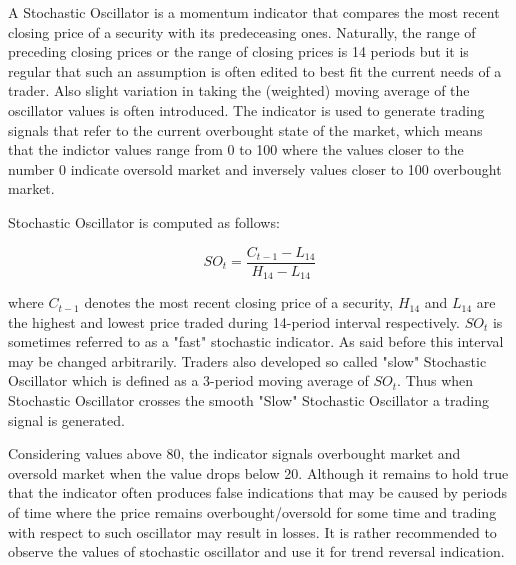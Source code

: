 	A Stochastic Oscillator is a momentum indicator that compares the most recent closing price of a security with its predeceasing ones. Naturally, the range of preceding closing prices or the range of closing prices is 14 periods but it is regular that such an assumption is often edited to best fit the current needs of a trader. Also slight variation in taking the (weighted) moving average of the oscillator values is often introduced. The indicator is used to generate trading signals that refer to the current overbought state of the market, which means that the indictor values range from 0 to 100 where the values closer to the number 0 indicate oversold market and inversely values closer to 100 overbought market. 
	
Stochastic Oscillator is computed as follows:

\begin{equation}
SO_{t} = \frac{C_{t-1} - L_{14}}{H_{14} - L_{14}}
\end{equation}

where $C_{t-1}$ denotes the most recent closing price of a security, $H_{14}$ and $L_{14}$ are the highest and lowest price traded during 14-period interval respectively. $SO_{t}$ is sometimes referred to as a "fast" stochastic indicator. As said before this interval may be changed arbitrarily. Traders also developed so called "slow" Stochastic Oscillator which is defined as a 3-period moving average of $SO_{t}$. Thus when Stochastic Oscillator crosses the smooth "Slow" Stochastic Oscillator a trading signal is generated.

Considering values above 80, the indicator signals overbought market and oversold market when the value drops below 20. Although it remains to hold true that the indicator often produces false indications that may be caused by periods of time where the price remains overbought/oversold for some time and trading with respect to such oscillator may result in losses. It is rather recommended to observe the values of stochastic oscillator and use it for trend reversal indication. 

